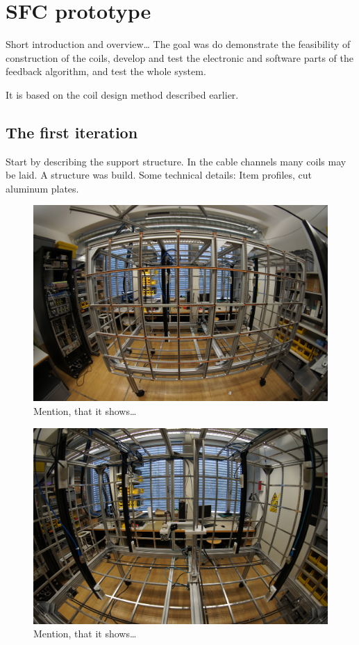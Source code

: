 \chapter{SFC prototype}
\label{ch:sfc-prototype}

Short introduction and overview\ldots
The goal was do demonstrate the feasibility of construction of the coils, develop and test the electronic and software parts of the feedback algorithm, and test the whole system.

It is based on the coil design method described earlier.


\section{The first iteration}
Start by describing the support structure. In the cable channels many coils may be laid. A structure was build. Some technical details: Item profiles, cut aluminum plates.

\begin{figure}
  \centering
  \includegraphics[width=0.9\linewidth]{gfx/prototype/DSC03472.JPG}
  \caption{Mention, that it shows\ldots}
  \label{fig:prototype_photo}
\end{figure}

\begin{figure}
  \centering
  \includegraphics[width=0.9\linewidth]{gfx/prototype/DSC03476.JPG}
  \caption{Mention, that it shows\ldots}
  \label{fig:prototype_photo_inside}
\end{figure}

